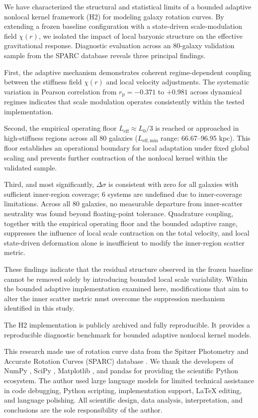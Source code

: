 \documentclass{aa}
\begin{document}
We have characterized the structural and statistical limits of a bounded
adaptive nonlocal kernel framework (H2) for modeling galaxy rotation curves.
By extending a frozen baseline configuration with a state-driven
scale-modulation field $\chi(r)$, we isolated the impact of local baryonic
structure on the effective gravitational response. Diagnostic evaluation
across an 80-galaxy validation sample from the SPARC database reveals three
principal findings.

First, the adaptive mechanism demonstrates coherent regime-dependent coupling
between the stiffness field $\chi(r)$ and local velocity adjustments. The
systematic variation in Pearson correlation from $r_{\mathrm{p}} = -0.371$
to $+0.981$ across dynamical regimes indicates that scale modulation
operates consistently within the tested implementation.

Second, the empirical operating floor $L_{\mathrm{eff}} \approx L_0/3$ is
reached or approached in high-stiffness regions across all 80 galaxies
($L_{\mathrm{eff,min}}$ range: 66.67--96.95 kpc). This floor establishes
an operational boundary for local adaptation under fixed global scaling and
prevents further contraction of the nonlocal kernel within the validated sample.

Third, and most significantly, $\Delta\sigma$ is consistent with zero for
all galaxies with sufficient inner-region coverage; 6 systems are undefined
due to inner-coverage limitations. Across all 80 galaxies, no measurable departure from inner-scatter neutrality was found beyond floating-point tolerance. Quadrature coupling, together with the empirical operating floor and the bounded adaptive range,
suppresses the influence of local scale contraction on the total velocity, and local state-driven deformation alone is insufficient to modify the inner-region scatter metric.

These findings indicate that the residual structure observed in the frozen
baseline cannot be removed solely by introducing bounded local scale
variability. Within the bounded adaptive implementation examined here,
modifications that aim to alter the inner scatter metric must overcome
the suppression mechanism identified in this study.

The H2 implementation is publicly archived and fully reproducible. It
provides a reproducible diagnostic benchmark for bounded adaptive
nonlocal kernel models.

\begin{acknowledgements}
	This research made use of rotation curve data from the Spitzer Photometry
	and Accurate Rotation Curves (SPARC) database \citep{lelli2016}. We thank
	the developers of NumPy \citep{numpy2020}, SciPy \citep{scipy2020},
	Matplotlib \citep{matplotlib2007}, and pandas \citep{pandas2010} for
	providing the scientific Python ecosystem.
	The author used large language models for limited technical assistance in
	code debugging, Python scripting, implementation support, LaTeX editing,
	and language polishing. All scientific design, data analysis,
	interpretation, and conclusions are the sole responsibility of the author.
\end{acknowledgements}
\end{document}
